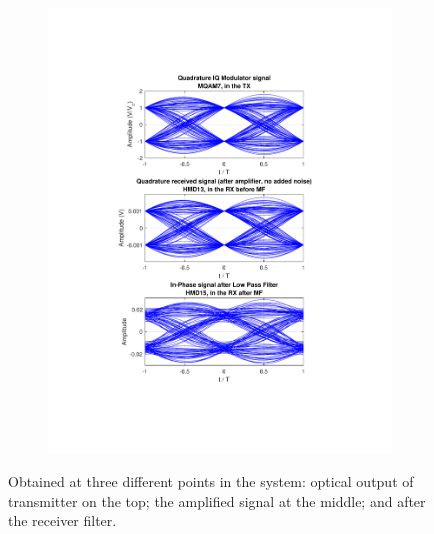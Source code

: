 \begin{refsection}
\begin{figure}[H]
\begin{minipage}{\linewidth}
\begin{subfigure}{.45\textwidth}
		\includegraphics[clip, trim=4cm 4cm 4cm 4cm,
			width=\textwidth]{./sdf/m_qam_system/figures/eyes/simulRc03Sp60Np00_q.pdf}
	\end{subfigure}
	
	\caption{
		Obtained at
		three different points in the system: optical output of transmitter on the top;
		the amplified signal at the middle; and
		after the receiver filter.
		\label{fig:eyes_nn_rc_03}}
	\end{minipage}
\end{figure}

\begin{table}[H]
	\centering
	

\end{table}
\end{refsection}
